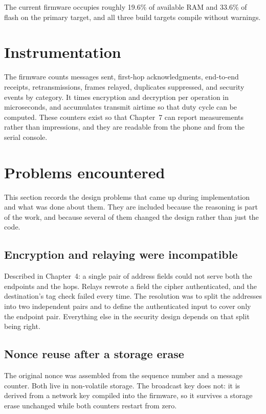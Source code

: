 \documentclass[12pt,a4paper,oneside]{report}
\begin{document}
The current firmware occupies roughly 19.6\% of available RAM and 33.6\% of flash
on the primary target, and all three build targets compile without warnings.

\section{Instrumentation}

The firmware counts messages sent, first-hop acknowledgments, end-to-end
receipts, retransmissions, frames relayed, duplicates suppressed, and security
events by category. It times encryption and decryption per operation in
microseconds, and accumulates transmit airtime so that duty cycle can be
computed. These counters exist so that Chapter~7 can report measurements rather
than impressions, and they are readable from the phone and from the serial
console.

\section{Problems encountered}

This section records the design problems that came up during implementation and
what was done about them. They are included because the reasoning is part of the
work, and because several of them changed the design rather than just the code.

\subsection{Encryption and relaying were incompatible}

Described in Chapter~4: a single pair of address fields could not serve both the
endpoints and the hops. Relays rewrote a field the cipher authenticated, and the
destination's tag check failed every time. The resolution was to split the
addresses into two independent pairs and to define the authenticated input to
cover only the endpoint pair. Everything else in the security design depends on
that split being right.

\subsection{Nonce reuse after a storage erase}
\label{sec:nonce}

The original nonce was assembled from the sequence number and a message counter.
Both live in non-volatile storage. The broadcast key does not: it is derived from
a network key compiled into the firmware, so it survives a storage erase
unchanged while both counters restart from zero.
\end{document}
